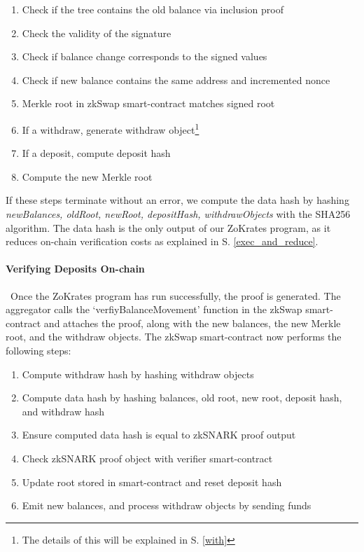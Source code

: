 \documentclass[../../thesis.tex]{subfiles}
\begin{document}
\begin{enumerate}
    \item Check if the tree contains the old balance via inclusion proof
    \item Check the validity of the signature
    \item Check if balance change corresponds to the signed values
    \item Check if new balance contains the same address and incremented nonce
    \item Merkle root in zkSwap smart-contract matches signed root
    \item If a withdraw, generate withdraw object\footnote{The details of this will be explained in S. \ref{with}}
    \item If a deposit, compute deposit hash
    \item Compute the new Merkle root
\end{enumerate}

If these steps terminate without an error, we compute the data hash by hashing \textit{newBalances, oldRoot, newRoot, depositHash, withdrawObjects} with the SHA256 algorithm. The data hash is the only output of our ZoKrates program, as it reduces on-chain verification costs as explained in S. \ref{exec_and_reduce}.

\paragraph{Verifying Deposits On-chain} \
Once the ZoKrates program has run successfully, the proof is generated. The aggregator calls the `verfiyBalanceMovement' function in the zkSwap smart-contract and attaches the proof, along with the new balances, the new Merkle root, and the withdraw objects. The zkSwap smart-contract now performs the following steps:

\begin{enumerate}
    \item Compute withdraw hash by hashing withdraw objects
    \item Compute data hash by hashing balances, old root, new root, deposit hash, and withdraw hash
    \item Ensure computed data hash is equal to zkSNARK proof output
    \item Check zkSNARK proof object with verifier smart-contract
    \item Update root stored in smart-contract and reset deposit hash
    \item Emit new balances, and process withdraw objects by sending funds
\end{enumerate}
\end{document}

